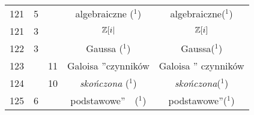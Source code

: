 \documentclass[a4paper,11pt]{article}
\numberwithin{equation}{section}
\begin{document}
\begin{center}
\begin{tabular}{|c|c|c|c|c|}
    121 &  5 & & algebraiczne ($^{ 1 }$) & algebraiczne($^{ 1 }$) \\
    121 &  3 & & $\mathbb{Z}[ i |$ & $\mathbb{Z}[ i ]$ \\
    122 &  3 & & Gaussa ($^{ 1 }$) & Gaussa($^{ 1 }$) \\
    123 & & 11 & Galoisa ”czynników  & Galoisa ” czynników \\
    124 & & 10 & \textit{skończona} ($^{ 1 }$)
           & \textit{skończona}($^{ 1 }$) \\
    125 &  6 & & podstawowe”~~($^{ 1 }$) & podstawowe”($^{ 1 }$) \\
    \hline
  \end{tabular}





  \newpage


\end{center}
\end{document}
